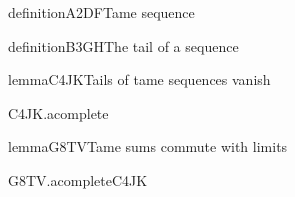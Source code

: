 \documentclass[11pt]{article}
\begin{document}

\begin{loomstatement}{definition}{A2DF}{Tame sequence}

\end{loomstatement}
\begin{loomstatement}{definition}{B3GH}{The tail of a sequence}

\end{loomstatement}
\begin{loomstatement}{lemma}{C4JK}{Tails of tame sequences vanish}

\end{loomstatement}
\begin{loomproof}{C4JK.a}{complete}{}

\end{loomproof}

\begin{loomstatement}{lemma}{G8TV}{Tame sums commute with \badtitlemacro{} limits}

\end{loomstatement}
\begin{loomproof}{G8TV.a}{complete}{C4JK}

\end{loomproof}



\end{document}
